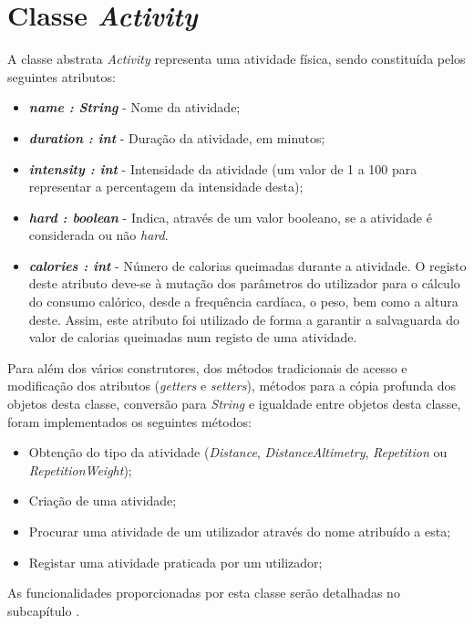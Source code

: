 \documentclass[a4paper,12pt]{scrreprt}
\begin{document}
\section{Classe \textit{Activity}}
    A classe abstrata \textit{Activity} representa uma atividade física, sendo constituída pelos seguintes atributos:

    \begin{itemize}
        \item \textit{\textbf{name : String}} - Nome da atividade;
        \item \textit{\textbf{duration : int}} - Duração da atividade, em minutos;
        \item \textit{\textbf{intensity : int}} - Intensidade da atividade (um valor de 1 a 100 para representar a percentagem da intensidade desta);
        \item \textit{\textbf{hard : boolean}} - Indica, através de um valor booleano, se a atividade é considerada ou não \textit{hard}.
        \item \textit{\textbf{calories : int}} - Número de calorias queimadas durante a atividade. O registo deste atributo deve-se à mutação dos parâmetros do utilizador para o cálculo do consumo calórico, desde a frequência cardíaca, o peso, bem como a altura deste. Assim, este atributo foi utilizado de forma a garantir a salvaguarda do valor de calorias queimadas num registo de uma atividade.
    \end{itemize}

    Para além dos vários construtores, dos métodos tradicionais de acesso e modificação dos atributos (\textit{getters} e \textit{setters}), métodos para a cópia profunda dos objetos desta classe, conversão para \textit{String} e igualdade entre objetos desta classe, foram implementados os seguintes métodos:
    \begin{itemize}
        \item Obtenção do tipo da atividade (\textit{Distance}, \textit{DistanceAltimetry}, \textit{Repetition} ou \textit{RepetitionWeight});
        \item Criação de uma atividade;
        \item Procurar uma atividade de um utilizador através do nome atribuído a esta;
        \item Registar uma atividade praticada por um utilizador;
    \end{itemize}

    As funcionalidades proporcionadas por esta classe serão detalhadas no subcapítulo \textit{}.
\end{document}
